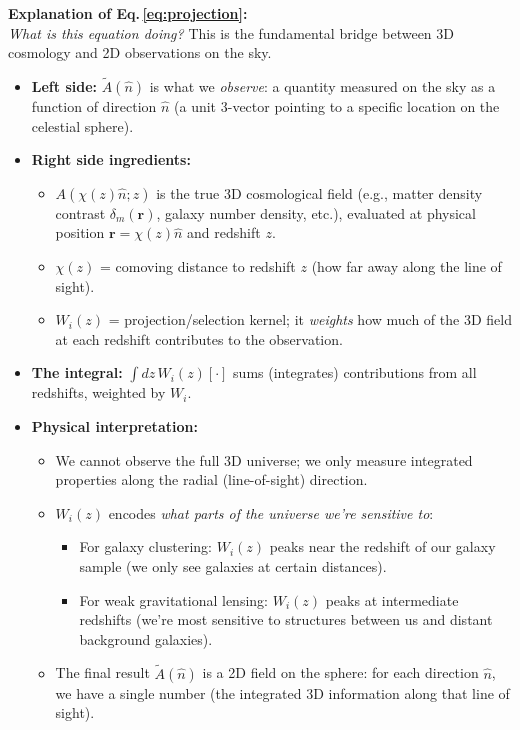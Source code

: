 \noindent\textbf{\large Explanation of Eq.\,\eqref{eq:projection}:}\\
\textit{What is this equation doing?} This is the fundamental bridge between 3D cosmology and 2D observations on the sky.
\begin{itemize}[leftmargin=1.5cm]
    \item \textbf{Left side:} $\tilde{A}(\hat{n})$ is what we \emph{observe}: a quantity measured on the sky as a function of direction $\hat{n}$ (a unit 3-vector pointing to a specific location on the celestial sphere).
    
    \item \textbf{Right side ingredients:}
        \begin{itemize}
            \item $A(\chi(z)\hat{n}; z)$ is the true 3D cosmological field (e.g., matter density contrast $\delta_m(\mathbf{r})$, galaxy number density, etc.), evaluated at physical position $\mathbf{r} = \chi(z) \hat{n}$ and redshift $z$.
            \item $\chi(z)$ = comoving distance to redshift $z$ (how far away along the line of sight).
            \item $W_i(z)$ = projection/selection kernel; it \emph{weights} how much of the 3D field at each redshift contributes to the observation.
        \end{itemize}
    \item \textbf{The integral:} $\int dz\, W_i(z) [\cdot]$ sums (integrates) contributions from all redshifts, weighted by $W_i$.
    
    \item \textbf{Physical interpretation:}
        \begin{itemize}
            \item We cannot observe the full 3D universe; we only measure integrated properties along the radial (line-of-sight) direction.
            \item $W_i(z)$ encodes \emph{what parts of the universe we're sensitive to}:
                \begin{itemize}
                    \item For galaxy clustering: $W_i(z)$ peaks near the redshift of our galaxy sample (we only see galaxies at certain distances).
                    \item For weak gravitational lensing: $W_i(z)$ peaks at intermediate redshifts (we're most sensitive to structures between us and distant background galaxies).
                \end{itemize}
            \item The final result $\tilde{A}(\hat{n})$ is a 2D field on the sphere: for each direction $\hat{n}$, we have a single number (the integrated 3D information along that line of sight).
        \end{itemize}
\end{itemize}

